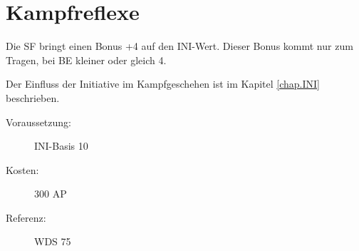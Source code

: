 \section{Kampfreflexe}
\label{sf.kampfreflexe}
Die SF  bringt einen Bonus +4 auf den INI-Wert.
Dieser Bonus kommt nur zum Tragen, bei BE kleiner oder gleich 4.

Der Einfluss der Initiative im Kampfgeschehen ist im Kapitel \ref{chap.INI} beschrieben.
\begin{description}
    \item[Voraussetzung:]
        INI-Basis 10
    \item [Kosten:]
        300 AP
    \item [Referenz:]
        WDS 75
\end{description}
